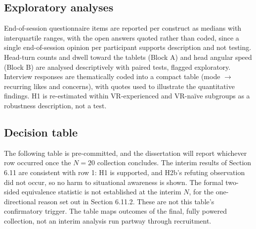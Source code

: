 \subsection{Exploratory analyses}

End-of-session questionnaire items are reported per construct as
medians with interquartile ranges, with the open answers quoted rather than coded, since a
single end-of-session opinion per participant supports description and not testing. Head-turn counts and dwell toward the tablets (Block A) and head angular
speed (Block B) are analysed descriptively with paired tests, flagged exploratory. Interview responses
are thematically coded into a compact table (mode $\rightarrow$ recurring likes and concerns), with quotes
used to illustrate the quantitative findings. H1 is re-estimated within VR-experienced and VR-naïve
subgroups as a robustness description, not a test.

\subsection{Decision table}

The following table is pre-committed, and the dissertation will report whichever row occurred once the
$N = 20$ collection concludes. The interim results of Section 6.11 are consistent with row 1: H1 is supported, and H2b's refuting
observation did not occur, so no harm to situational awareness is shown. The formal two-sided
equivalence statistic is not established at the interim $N$, for the one-directional reason set out
in Section 6.11.2. These are not this table's confirmatory trigger. The
table maps outcomes of the final, fully powered collection, not an interim analysis run partway
through recruitment.

